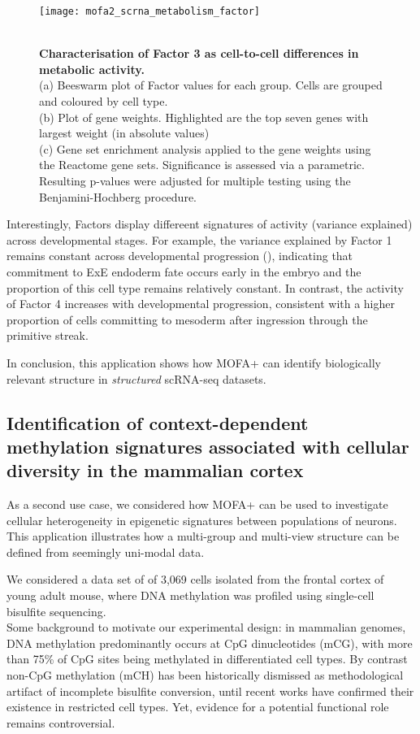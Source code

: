 \begin{figure}[H]
	\centering
	\texttt{[image: mofa2\_scrna\_metabolism\_factor]}
	\caption[]{ \\
	\textbf{Characterisation of Factor 3 as cell-to-cell differences in metabolic activity.} \\
	(a) Beeswarm plot of Factor values for each group. Cells are grouped and coloured by cell type. \\
	(b) Plot of gene weights. Highlighted are the top seven genes with largest weight (in absolute values) \\
	(c) Gene set enrichment analysis applied to the gene weights using the Reactome gene sets\cite{Fabregat2015}. Significance is assessed via a parametric. Resulting p-values were adjusted for multiple testing using the Benjamini-Hochberg procedure.
	}
	\label{fig:mofa2_scrna_metabolism_factor}
\end{figure}

Interestingly, Factors display differeent signatures of activity (variance explained) across developmental stages. For example, the variance explained by Factor 1 remains constant across developmental progression (), indicating that commitment to ExE endoderm fate occurs early in the embryo and the proportion of this cell type remains relatively constant. In contrast, the activity of Factor 4 increases with developmental progression, consistent with a higher proportion of cells committing to mesoderm after ingression through the primitive streak. 

In conclusion, this application shows how MOFA+ can identify biologically relevant structure in \textit{structured} scRNA-seq datasets.


\subsection{Identification of context-dependent methylation signatures associated with cellular diversity in the mammalian cortex}

As a second use case, we considered how MOFA+ can be used to investigate cellular heterogeneity  in epigenetic signatures between populations of neurons. This application illustrates how a multi-group and multi-view structure can be defined from seemingly uni-modal data.

We considered a data set of of 3,069 cells isolated from the frontal cortex of young adult mouse, where DNA methylation was profiled using single-cell bisulfite sequencing\cite{Luo2018}.\\Some background to motivate our experimental design: in mammalian genomes, DNA methylation predominantly occurs at CpG dinucleotides (mCG), with more than 75\% of CpG sites being methylated in differentiated cell types. By contrast non-CpG methylation (mCH) has been historically dismissed as methodological artifact of incomplete bisulfite conversion, until recent works have confirmed their existence in restricted cell types. Yet, evidence for a potential functional role remains controversial\cite{He2015}.

